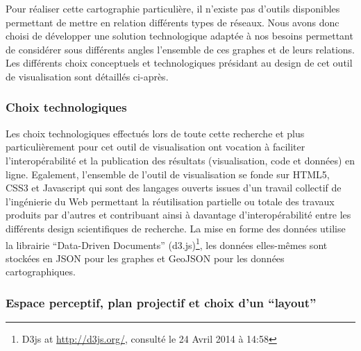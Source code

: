 Pour réaliser cette cartographie particulière, il
n{\textquoteright}existe pas d{\textquoteright}outils disponibles
permettant de mettre en relation différents types de réseaux. Nous
avons donc choisi de développer une solution technologique adaptée
à nos besoins permettant de considérer sous différents angles
l{\textquoteright}ensemble de ces graphes et de leurs relations. Les
différents choix conceptuels et technologiques présidant au design
de cet outil de visualisation sont détaillés ci-après.

\subsubsection{Choix technologiques}

Les choix technologiques effectués lors de toute cette recherche et
plus particulièrement pour cet outil de visualisation ont vocation
à faciliter l{\textquoteright}interopérabilité et la publication
des résultats (visualisation, code et données) en ligne. Egalement,
l{\textquoteright}ensemble de l{\textquoteright}outil de visualisation
se fonde sur HTML5, CSS3 et Javascript qui sont des langages ouverts
issues d{\textquoteright}un travail collectif de
l{\textquoteright}ingénierie du Web permettant la réutilisation
partielle ou totale des travaux produits par d{\textquoteright}autres
et contribuant ainsi à davantage
d{\textquoteright}interopérabilité entre les différents design
scientifiques de recherche. La mise en forme des données utilise la
librairie {\textquotedblleft}Data-Driven Documents{\textquotedblright}
(d3.js)\footnote{ D3js at \url{http://d3js.org/,} consulté le 24
Avril 2014 à 14:58}, les données elles-m\^emes sont stockées en
JSON pour les graphes et GeoJSON pour les données cartographiques.

\subsubsection{Espace perceptif, plan projectif et choix
d{\textquoteright}un {\textquotedblleft}layout{\textquotedblright}}

